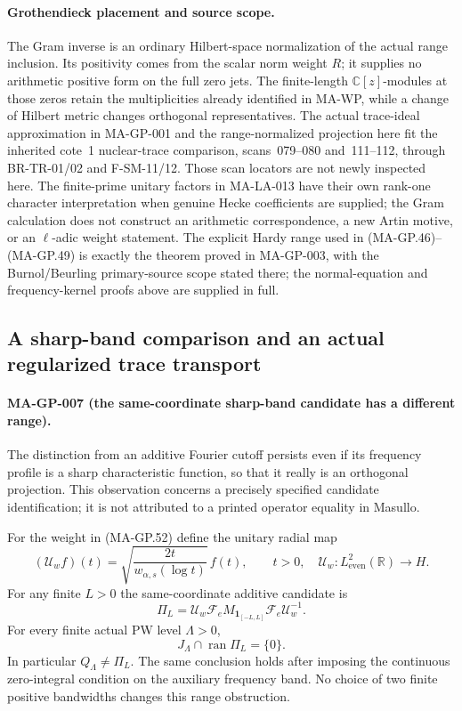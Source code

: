 \paragraph{Grothendieck placement and source scope.}
The Gram inverse is an ordinary Hilbert-space normalization
of the actual range inclusion.  Its positivity comes from
the scalar norm weight $R$; it supplies no arithmetic
positive form on the full zero jets.  The finite-length
$\mathbb C[z]$-modules at those zeros retain the multiplicities
already identified in MA-WP, while a change of Hilbert metric
changes orthogonal representatives.  The actual trace-ideal
approximation in MA-GP-001 and the range-normalized projection
here fit the inherited cote~1 nuclear-trace comparison,
scans~079--080 and~111--112, through BR-TR-01/02 and
F-SM-11/12.  Those scan locators are not newly inspected here.
The finite-prime unitary factors in MA-LA-013 have their own
rank-one character interpretation when genuine Hecke coefficients
are supplied; the Gram calculation does not construct an
arithmetic correspondence, a new Artin motive, or an
$\ell$-adic weight statement.  The explicit Hardy range used
in (MA-GP.46)--(MA-GP.49) is exactly the theorem proved in
MA-GP-003, with the Burnol/Beurling primary-source scope stated
there; the normal-equation and frequency-kernel proofs above
are supplied in full.

\subsection{A sharp-band comparison and an actual regularized trace transport}

\paragraph{MA-GP-007 (the same-coordinate sharp-band candidate has a different range).}
The distinction from an additive Fourier cutoff persists even if its
frequency profile is a sharp characteristic function, so that it really
is an orthogonal projection.  This observation concerns a precisely
specified candidate identification; it is not attributed to a printed
operator equality in Masullo.

For the weight in (MA-GP.52) define the unitary radial map
\[
 (\mathcal U_w f)(t)
       =\sqrt{\frac{2t}{w_{\alpha,s}(\log t)}}\,f(t),\qquad t>0,
 \quad
 \mathcal U_w:L^2_{\mathrm{even}}(\mathbb R)\longrightarrow H.
 \tag{MA-GP.60}
\]
For any finite $L>0$ the same-coordinate additive candidate is
\[
 \Pi_L=\mathcal U_w\mathcal F_e
         M_{\mathbf1_{[-L,L]}}\mathcal F_e\mathcal U_w^{-1}.
 \tag{MA-GP.61}
\]
For every finite actual PW level $\Lambda>0$,
\[
               J_\Lambda\cap\operatorname{ran}\Pi_L=\{0\}.
 \tag{MA-GP.62}
\]
In particular $Q_\Lambda\ne\Pi_L$.  The same conclusion holds
after imposing the continuous zero-integral condition on the
auxiliary frequency band.  No choice of two finite positive
bandwidths changes this range obstruction.

